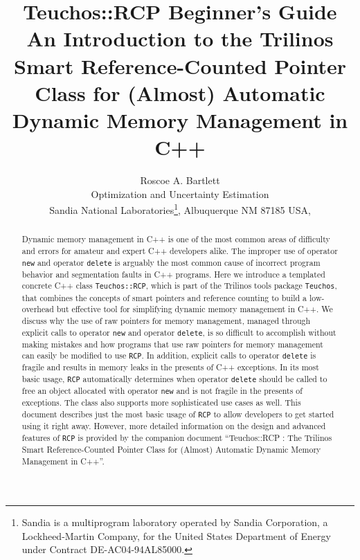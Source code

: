 \documentclass[pdf,ps2pdf,11pt]{SANDreport}
\title{\center
{\Huge\bf Teuchos::RCP Beginner's Guide}\\[1.5ex]
An Introduction to the Trilinos Smart Reference-Counted Pointer
Class for (Almost) Automatic Dynamic Memory Management in C++
}
\author{
Roscoe A. Bartlett \\ Optimization and Uncertainty Estimation \\
Sandia National Laboratories\footnote{
Sandia is a multiprogram laboratory operated by Sandia Corporation, a
Lockheed-Martin Company, for the United States Department of Energy
under Contract DE-AC04-94AL85000.}, Albuquerque NM 87185 USA, \\
}
\date{}
\begin{document}
\maketitle

%

%
\begin{abstract}
%
Dynamic memory management in C++ is one of the most common areas of
difficulty and errors for amateur and expert C++ developers alike.
The improper use of operator {}\texttt{new} and operator
{}\texttt{delete} is arguably the most common cause of incorrect
program behavior and segmentation faults in C++ programs.  Here we
introduce a templated concrete C++ class
{}\texttt{Teuchos\-::RCP}, which is part of the Trilinos
tools package {}\texttt{Teuchos}, that combines the concepts of smart
pointers and reference counting to build a low-overhead but effective
tool for simplifying dynamic memory management in C++.  We discuss why
the use of raw pointers for memory management, managed through
explicit calls to operator {}\texttt{new} and operator
{}\texttt{delete}, is so difficult to accomplish without making
mistakes and how programs that use raw pointers for memory management
can easily be modified to use {}\texttt{RCP}.  In
addition, explicit calls to operator {}\texttt{delete} is fragile and
results in memory leaks in the presents of C++ exceptions.  In its
most basic usage, {}\texttt{RCP} automatically
determines when operator {}\texttt{delete} should be called to free an
object allocated with operator {}\texttt{new} and is not fragile in
the presents of exceptions.  The class also supports more
sophisticated use cases as well.  This document describes just the
most basic usage of {}\texttt{RCP} to allow developers
to get started using it right away.  However, more detailed
information on the design and advanced features of
{}\texttt{RCP} is provided by the companion document
``Teuchos::RCP : The Trilinos Smart Reference-Counted Pointer
Class for (Almost) Automatic Dynamic Memory Management in C++''.
%
\end{abstract}
%

%
\clearpage
\end{document}
